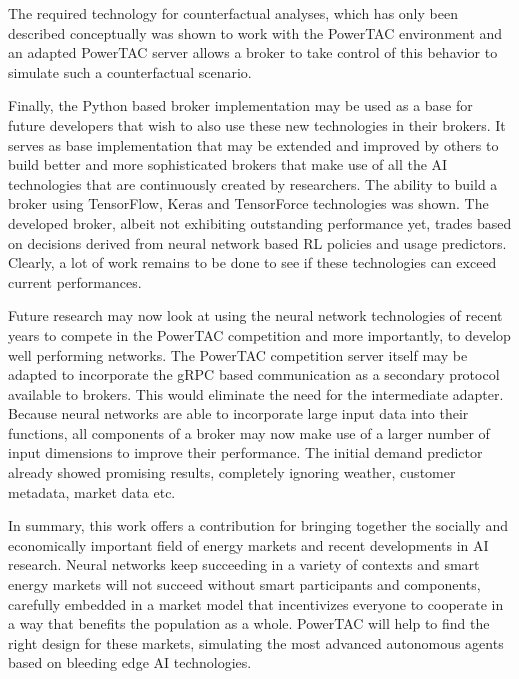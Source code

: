 The required technology for counterfactual analyses, which has only been described conceptually was shown to work with
the \ac{PowerTAC} environment and an adapted \ac{PowerTAC} server allows a broker to take control of this behavior to
simulate such a counterfactual scenario.

Finally, the Python based broker implementation may be used as a base for future developers that wish to also use these
new technologies in their brokers. It serves as base implementation that may be extended and improved by others to build
better and more sophisticated brokers that make use of all the \ac{AI} technologies that are continuously created by
researchers. The ability to build a broker using TensorFlow, Keras and TensorForce technologies was shown. The
developed broker, albeit not exhibiting outstanding performance yet, trades based on decisions derived from neural network based \ac{RL}
policies and usage predictors. Clearly, a lot of work remains to be done to see if these technologies can exceed current
performances.


Future research may now look at using the neural network technologies of recent years to compete in the \ac{PowerTAC}
competition and more importantly, to develop well performing networks. The \ac{PowerTAC} competition server itself may
be adapted to incorporate the \ac{gRPC} based communication as a secondary protocol available to brokers. This would
eliminate the need for the intermediate adapter. Because neural networks are able to incorporate large input data into
their functions, all components of a broker may now make use of a larger number of input dimensions to improve their
performance. The initial demand predictor already showed promising results, completely ignoring weather, customer
metadata, market data etc.

In summary, this work offers a contribution for bringing together the socially and economically important field of
energy markets and recent developments in \ac{AI} research. Neural networks keep succeeding in a variety of
contexts and smart energy markets will not succeed without smart participants and components, carefully embedded in a
market model that incentivizes everyone to cooperate in a way that benefits the population as a whole. \ac{PowerTAC}
will help to find the right design for these markets, simulating the most advanced autonomous agents based on bleeding
edge \ac{AI} technologies.
